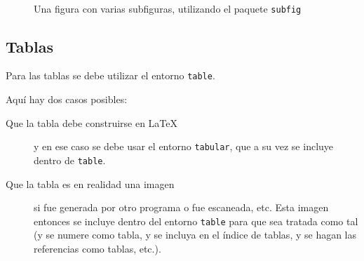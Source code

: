 \begin{figure}[h!]
\centering
{}
\qquad
{}
\\
\qquad
{}
\caption{Una figura con varias subfiguras, utilizando el paquete \texttt{subfig}}
\label{F:subfiguras}
\end{figure}

\subsection{Tablas}

Para las tablas se debe utilizar el entorno \verb+table+.

Aquí hay dos casos posibles:

\begin{description}

\item [Que la tabla debe construirse en \LaTeX] y en ese caso se debe usar el entorno \verb+tabular+, que a su vez se incluye dentro de \verb+table+.

\item [Que la tabla es en realidad una imagen] si fue generada por otro programa o fue escaneada, etc. Esta imagen entonces se incluye dentro del entorno \verb+table+ para que sea tratada como tal (y se numere como tabla, y se incluya en el índice de tablas, y se hagan las referencias como tablas, etc.).

\end{description}

